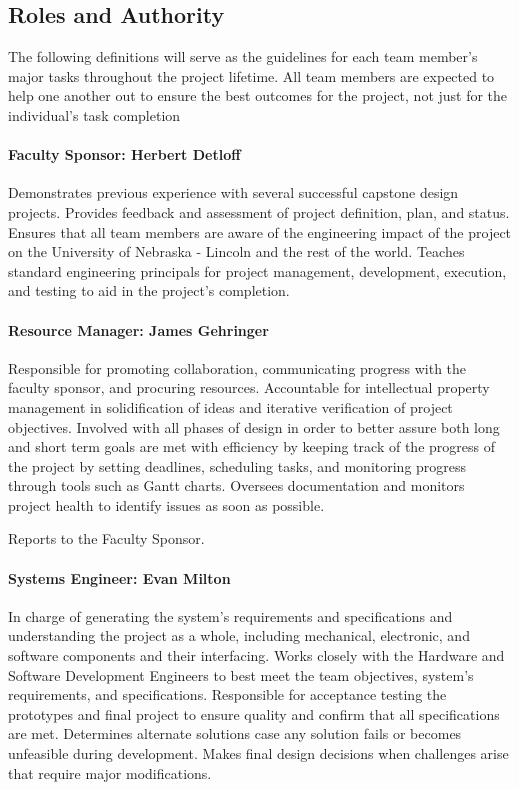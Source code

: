 \subsection{Roles and Authority}
The following definitions will serve as the guidelines for each team member's major tasks throughout the project lifetime. All team members are expected to help one another out to ensure the best outcomes for the project, not just for the individual's task completion
\paragraph{Faculty Sponsor: Herbert Detloff}
Demonstrates previous experience with several successful capstone design projects.
Provides feedback and assessment of project definition, plan, and status.
Ensures that all team members are aware of the engineering impact of the project on the University of Nebraska - Lincoln and the rest of the world.
Teaches standard engineering principals for project management, development, execution, and testing to aid in the project's completion.

\paragraph{Resource Manager: James Gehringer}
Responsible for promoting collaboration, communicating progress with the faculty sponsor, and procuring resources.
Accountable for intellectual property management in solidification of ideas and iterative verification of project objectives.
Involved with all phases of design in order to better assure both long and short term goals are met with efficiency by keeping track of the progress of the project by setting deadlines, scheduling tasks, and monitoring progress through tools such as Gantt charts.
Oversees documentation and monitors project health to identify issues as soon as possible.

Reports to the Faculty Sponsor. 

\paragraph{Systems Engineer: Evan Milton}
In charge of generating the system's requirements and specifications and understanding the project as a whole, including mechanical, electronic, and software components and their interfacing.
Works closely with the Hardware and Software Development Engineers to best meet the team objectives, system's requirements, and specifications.
Responsible for acceptance testing the prototypes and final project to ensure quality and confirm that all specifications are met.
Determines alternate solutions case any solution fails or becomes unfeasible during development.
Makes final design decisions when challenges arise that require major modifications.

